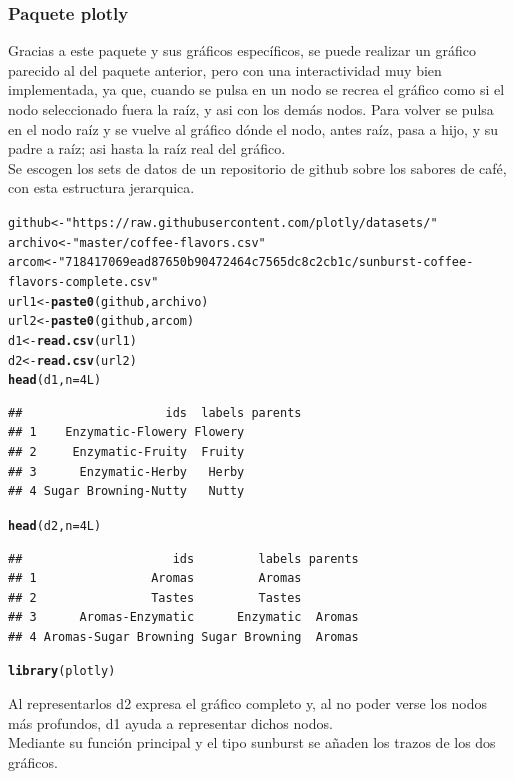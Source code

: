 \documentclass{article}\usepackage[]{graphicx}\usepackage[]{color}
\makeatletter
\newcommand{\hlnum}[1]{\textcolor[rgb]{0.686,0.059,0.569}{#1}}%
\newcommand{\hlstr}[1]{\textcolor[rgb]{0.192,0.494,0.8}{#1}}%
\newcommand{\hlstd}[1]{\textcolor[rgb]{0.345,0.345,0.345}{#1}}%
\newcommand{\hlkwb}[1]{\textcolor[rgb]{0.69,0.353,0.396}{#1}}%
\newcommand{\hlkwc}[1]{\textcolor[rgb]{0.333,0.667,0.333}{#1}}%
\newcommand{\hlkwd}[1]{\textcolor[rgb]{0.737,0.353,0.396}{\textbf{#1}}}%
\newenvironment{kframe}{%
 \def\at@end@of@kframe{}%
 \ifinner\ifhmode%
  \def\at@end@of@kframe{\end{minipage}}%
  \begin{minipage}{\columnwidth}%
 \fi\fi%
 \def\FrameCommand##1{\hskip\@totalleftmargin \hskip-\fboxsep
 \colorbox{shadecolor}{##1}\hskip-\fboxsep
     \hskip-\linewidth \hskip-\@totalleftmargin \hskip\columnwidth}%
 \MakeFramed {\advance\hsize-\width
   \@totalleftmargin\z@ \linewidth\hsize
   \@setminipage}}%
 {\par\unskip\endMakeFramed%
 \at@end@of@kframe}
\newenvironment{knitrout}{}{} %
\makeatother
\begin{document}
\subsubsection{Paquete plotly}
Gracias a este paquete\cite{docu_plotly} y sus gr\'aficos espec\'ificos, se puede realizar un gr\'afico parecido al del paquete anterior, pero con una interactividad muy bien implementada, ya que, cuando se pulsa en un nodo se recrea el gr\'afico como si el nodo seleccionado fuera la ra\'iz, y asi con los dem\'as nodos. Para volver se pulsa en el nodo ra\'iz y se vuelve al gr\'afico d\'onde el nodo, antes ra\'iz, pasa a hijo, y su padre a ra\'iz; asi hasta la ra\'iz real del gr\'afico.~\\
Se escogen los sets de datos de un repositorio de github sobre los sabores de caf\'e, con esta estructura jerarquica.
\begin{knitrout}
\color{fgcolor}\begin{kframe}
\begin{alltt}
\hlstd{github} \hlkwb{<-} \hlstr{"https://raw.githubusercontent.com/plotly/datasets/"}
\hlstd{archivo} \hlkwb{<-} \hlstr{"master/coffee-flavors.csv"}
\hlstd{arcom} \hlkwb{<-} \hlstr{"718417069ead87650b90472464c7565dc8c2cb1c/sunburst-coffee-flavors-complete.csv"}
\hlstd{url1} \hlkwb{<-} \hlkwd{paste0}\hlstd{(github, archivo)}
\hlstd{url2} \hlkwb{<-} \hlkwd{paste0}\hlstd{(github, arcom)}
\hlstd{d1} \hlkwb{<-} \hlkwd{read.csv}\hlstd{(url1)}
\hlstd{d2} \hlkwb{<-} \hlkwd{read.csv}\hlstd{(url2)}
\hlkwd{head}\hlstd{(d1,} \hlkwc{n}\hlstd{=}\hlnum{4L}\hlstd{)}
\end{alltt}
\begin{verbatim}
##                    ids  labels parents
## 1    Enzymatic-Flowery Flowery        
## 2     Enzymatic-Fruity  Fruity        
## 3      Enzymatic-Herby   Herby        
## 4 Sugar Browning-Nutty   Nutty
\end{verbatim}
\begin{alltt}
\hlkwd{head}\hlstd{(d2,} \hlkwc{n}\hlstd{=}\hlnum{4L}\hlstd{)}
\end{alltt}
\begin{verbatim}
##                     ids         labels parents
## 1                Aromas         Aromas        
## 2                Tastes         Tastes        
## 3      Aromas-Enzymatic      Enzymatic  Aromas
## 4 Aromas-Sugar Browning Sugar Browning  Aromas
\end{verbatim}
\begin{alltt}
\hlkwd{library}\hlstd{(plotly)}
\end{alltt}
\end{kframe}
\end{knitrout}
Al representarlos d2 expresa el gr\'afico completo y, al no poder verse los nodos m\'as profundos, d1 ayuda a representar dichos nodos.~\\ Mediante su funci\'on principal y el tipo sunburst se a\~naden los trazos de los dos gr\'aficos.
\end{document}
